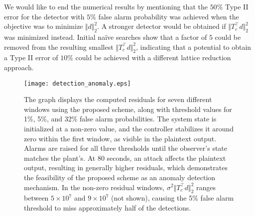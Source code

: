 \documentclass[journal, twoside, web]{ieeecolorpreprint}
\begin{document}
We would like to end the numerical results by mentioning that the $50\%$ Type II error for the detector with $5\%$ false alarm probability was achieved when the objective was to minimize $\Vert d \Vert_2^2$. A stronger detector would be obtained if $\Vert T_c^\top d \Vert_2^2$ was minimized instead. Initial naïve searches show that a factor of $5$ could be removed from the resulting smallest $\Vert T_c^\top d \Vert_2^2$, indicating that a potential to obtain a Type II error of $10\%$ could be achieved with a different lattice reduction approach.




\begin{figure}
    \texttt{[image: detection\_anomaly.eps]}
    \caption{The graph displays the computed residuals for seven different windows using the proposed scheme, along with threshold values for 1\%, 5\%, and 32\% false alarm probabilities. The system state is initialized at a non-zero value, and the controller stabilizes it around zero within the first window, as visible in the plaintext output. Alarms are raised for all three thresholds until the observer's state matches the plant's. At 80 seconds, an attack affects the plaintext output, resulting in generally higher residuals, which demonstrates the feasibility of the proposed scheme as an anomaly detection mechanism. In the non-zero residual windows, $\sigma^2\Vert T_c^\top d \Vert_2^2$ ranges between $5 \times 10^7$ and $9 \times 10^7$ (not shown), causing the 5\% false alarm threshold to miss approximately half of the detections.}
    \label{fig:detection}
\end{figure}

\end{document}
